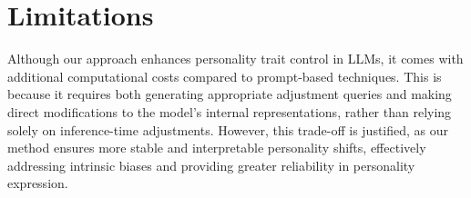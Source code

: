\section*{Limitations}
Although our approach enhances personality trait control in LLMs, it comes with additional computational costs compared to prompt-based techniques. This is because it requires both generating appropriate adjustment queries and making direct modifications to the model’s internal representations, rather than relying solely on inference-time adjustments. However, this trade-off is justified, as our method ensures more stable and interpretable personality shifts, effectively addressing intrinsic biases and providing greater reliability in personality expression.